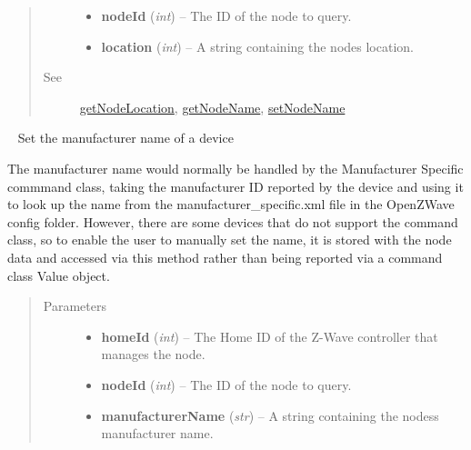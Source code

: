 \documentclass[letterpaper,10pt,english]{sphinxmanual}
\begin{document}
\begin{fulllineitems}
\begin{fulllineitems}
\begin{quote}
\begin{description}
\begin{itemize}
\item {} 
\textbf{nodeId} (\emph{int}) -- The ID of the node to query.

\item {} 
\textbf{location} (\emph{int}) -- A string containing the nodes location.

\end{itemize}

\item[{See}] \leavevmode
{\hyperref[libopenzwave:getnodelocation]{getNodeLocation}}, {\hyperref[libopenzwave:getnodename]{getNodeName}}, {\hyperref[libopenzwave:setnodename]{setNodeName}}

\end{description}\end{quote}

\end{fulllineitems}


\begin{fulllineitems}
\label{libopenzwave:libopenzwave.PyManager.setNodeManufacturerName}~\label{libopenzwave:setnodemanufacturername}
Set the manufacturer name of a device

The manufacturer name would normally be handled by the Manufacturer Specific
commmand class, taking the manufacturer ID reported by the device and using it
to look up the name from the manufacturer\_specific.xml file in the OpenZWave
config folder.  However, there are some devices that do not support the command
class, so to enable the user to manually set the name, it is stored with the
node data and accessed via this method rather than being reported via a command
class Value object.
\begin{quote}\begin{description}
\item[{Parameters}] \leavevmode\begin{itemize}
\item {} 
\textbf{homeId} (\emph{int}) -- The Home ID of the Z-Wave controller that manages the node.

\item {} 
\textbf{nodeId} (\emph{int}) -- The ID of the node to query.

\item {} 
\textbf{manufacturerName} (\emph{str}) -- A string containing the nodess manufacturer name.


\end{itemize}
\end{description}
\end{quote}
\end{fulllineitems}
\end{fulllineitems}
\end{document}

